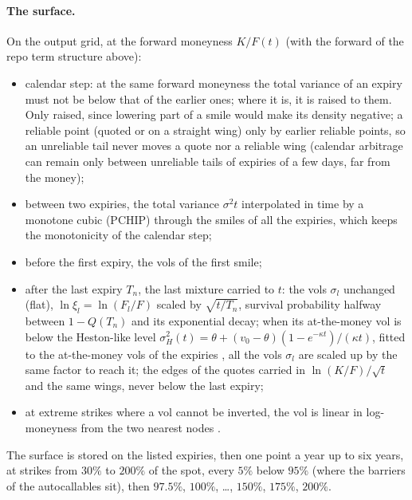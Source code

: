 \paragraph{The surface.} On the output grid, at the forward moneyness $K/F(t)$ (with the forward of the repo term
structure above):
\begin{itemize}[nosep]
  \item calendar step: at the same forward moneyness the total variance of an expiry must not be below that of the
        earlier ones; where it is, it is raised to them. Only raised, since lowering part of a smile would make its
        density negative; a reliable point (quoted or on a straight wing) only by earlier reliable points, so an
        unreliable tail never moves a quote nor a reliable wing (calendar arbitrage can remain only between unreliable
        tails of expiries of a few days, far from the money);
  \item between two expiries, the total variance $\sigma^2 t$ interpolated in time by a monotone cubic (PCHIP) through
        the smiles of all the expiries, which keeps the monotonicity of the calendar step;
  \item before the first expiry, the vols of the first smile;
  \item after the last expiry $T_n$, the last mixture carried to $t$: the vols $\sigma_l$ unchanged (flat),
        $\ln\xi_l = \ln(F_l/F)$ scaled by $\sqrt{t/T_n}$, survival probability halfway between $1 - Q(T_n)$ and its exponential decay;
        when its at-the-money vol is below the Heston-like level
        $\sigma_H^2(t) = \theta + (v_0 - \theta)(1 - e^{-\kappa t})/(\kappa t)$, fitted to the at-the-money vols of the
        expiries \citep{gatheral2006}, all the vols $\sigma_l$ are scaled up by the same factor to reach it; the edges of
        the quotes carried in $\ln(K/F)/\sqrt t$ and the same wings, never below the last expiry;
  \item at extreme strikes where a vol cannot be inverted, the vol is linear in log-moneyness from the two nearest
        nodes \citep{lee2004}.
\end{itemize}
The surface is stored on the listed expiries, then one point a year up to six years, at strikes from $30\%$ to $200\%$
of the spot, every $5\%$ below $95\%$ (where the barriers of the autocallables sit), then $97.5\%$, $100\%$, \dots,
$150\%$, $175\%$, $200\%$.
